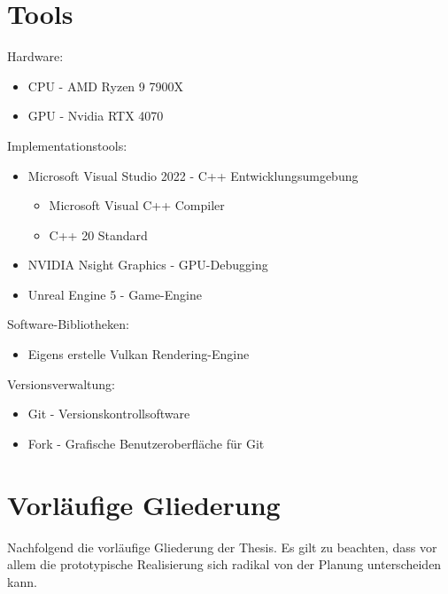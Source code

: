 \documentclass[11pt]{scrartcl}
\begin{document}
	\pagebreak
	
	\section{Tools}

	\medskip
	\noindent
	Hardware:
	\begin{itemize}
		\item CPU - AMD Ryzen 9 7900X
		\item GPU - Nvidia RTX 4070
	\end{itemize}
	\medskip
	\noindent
	Implementationstools:
	\begin{itemize}
		\item Microsoft Visual Studio 2022 - C++ Entwicklungsumgebung
		\begin{itemize}
			\item Microsoft Visual C++ Compiler
			\item C++ 20 Standard
		\end{itemize}
		\item NVIDIA Nsight Graphics - GPU-Debugging
		\item Unreal Engine 5 - Game-Engine
	\end{itemize}
	
	\medskip
	\noindent
	Software-Bibliotheken:
	\begin{itemize}
		\item Eigens erstelle Vulkan Rendering-Engine
	\end{itemize}
	
	\medskip
	\noindent
	Versionsverwaltung:
	\begin{itemize}
		\item Git - Versionskontrollsoftware
		\item Fork - Grafische Benutzeroberfläche für Git 
	\end{itemize}
	
	\pagebreak
	
	\section{\label{sec:gliederung}Vorläufige Gliederung}
	
	Nachfolgend die vorläufige Gliederung der Thesis. Es gilt zu beachten, dass vor allem die prototypische Realisierung sich radikal von der Planung unterscheiden kann.
	
\end{document}
